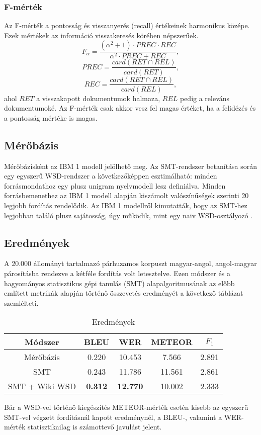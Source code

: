 \subsubsection{F-mérték}
Az F-mérték a pontosság és visszanyerés (recall) értékeinek harmonikus középe. Ezek mértékek az információ visszakeresés körében népszerűek. 
\begin{equation}
F_\alpha = \frac{(\alpha^2 + 1) \cdot PREC \cdot REC}{\alpha^2 \cdot PREC + REC},
\end{equation}
\begin{equation}
PREC = \frac{card(RET \cap REL)}{card(RET)},
\end{equation}
\begin{equation}
REC = \frac{card(RET \cap REL)}{card(REL)},
\end{equation}
ahol $RET$ a visszakapott dokumentumok halmaza, $REL$ pedig a releváns dokumentumoké. Az F-mérték csak akkor vesz fel magas értéket, ha a felidézés és a pontosság mértéke is magas.


\subsection{Mérőbázis}
Mérőbázisként az IBM 1 \cite{Collins} modell jelölhető meg. Az SMT-rendszer betanítása során egy egyszerű WSD-rendszer a következőképpen esztimálható: minden forrásmondathoz egy plusz unigram nyelvmodell lesz definiálva. Minden forrásbemenethez az IBM 1 modell alapján kiszámolt valószínűségek szerinti 20 legjobb fordítás rendelődik. Az IBM 1 modellről kimutatták, hogy az SMT-hez legjobban találó plusz sajátosság, úgy működik, mint egy naiv WSD-osztályozó \cite{Crego10local}.

\subsection{Eredmények}
A 20.000 állományt tartalmazó párhuzamos korpuszt magyar-angol, angol-magyar párosításba rendezve a kétféle fordítás volt letesztelve. Ezen módszer és a hagyományos statisztikus gépi tanulás (SMT) alapalgoritmusának az előbb említett metrikák alapján történő összevetés eredményét a következő táblázat szemlélteti.

\begin{table}[h!]
\centering
\normalsize
 \begin{tabular}{| c | c | c | c | c |} 
 \hline
 Módszer & BLEU & WER & METEOR & $F_1$ \\
 \hline\hline
 Mérőbázis &  0.220 & 10.453 & 7.566 & 2.891\\
 \hline
 SMT &  0.243 & 11.786 & 11.561 & 2.861\\ 
 
 SMT + Wiki WSD &  \textbf{0.312} & \textbf{12.770} & 10.002 & 2.333 \\ 
 \hline
 \end{tabular}
 \caption{Eredmények}
\end{table}

 Bár a WSD-vel történő kiegészítés METEOR-mérték esetén kisebb az egyszerű SMT-vel végzett fordításnál kapott eredménynél, a BLEU-, valamint a WER-mérték statisztikailag is számottevő javulást jelent.


